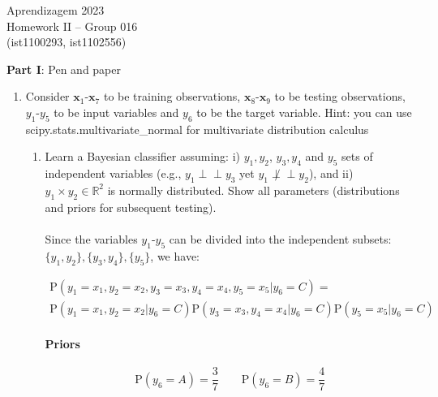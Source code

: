 \documentclass[12pt]{article}
\begin{document}
\newcommand{\prob}{\textrm{P}}
\newcommand{\ind}{\perp\!\!\!\!\!\perp} 
\newcommand{\notind}{\not\perp\!\!\!\!\!\perp}
\newcommand{\defeq}{\vcentcolon=}

\center
Aprendizagem 2023\\
Homework II -- Group 016\\
(ist1100293, ist1102556)\vskip 1cm

\large{\textbf{Part I}: Pen and paper}\normalsize

\begin{enumerate}[leftmargin=\labelsep]

\item Consider $\mathbf{x}_1$-$\mathbf{x}_7$ to be training observations, $\mathbf{x}_8$-$\mathbf{x}_9$ to be testing observations, $y_1$-$y_5$ to be input
variables and $y_6$ to be the target variable.
Hint: you can use scipy.stats.multivariate\_normal for multivariate distribution calculus

    \begin{enumerate}
        \item Learn a Bayesian classifier assuming: i) ${y_1, y_2}$, ${y_3, y_4}$ and ${y_5}$ sets of independent
        variables (e.g., $y_1 \ind y_3$ yet $y_1 \notind y_2$), and ii) $y_1 \times y_2 \in \mathbb{R}^2$
        is normally distributed. Show all
        parameters (distributions and priors for subsequent testing).

        \paragraph{} Since the variables $y_1$-$y_5$ can be divided into the independent subsets: $\{y_1, y_2\}, \{y_3, y_4\}, \{y_5\}$, we have:

        \begin{multline}
            \prob(y_1 = x_1, y_2 = x_2, y_3 = x_3, y_4 = x_4, y_5 = x_5 | y_6 = C) = \\
            \prob(y_1 = x_1, y_2 = x_2 | y_6 = C)\prob(y_3 = x_3, y_4 = x_4|y_6 = C)\prob(y_5 = x_5|y_6 = C)
        \end{multline}

        \paragraph{Priors}
        \begin{equation}
            \prob(y_6 = A) = \frac{3}{7} \qquad \prob(y_6 = B) = \frac{4}{7}
        \end{equation}


\end{enumerate}
\end{enumerate}
\end{document}
